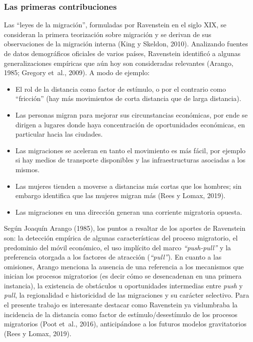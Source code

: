 \documentclass[12pt,spanish,]{article}
\begin{document}
\hypertarget{las-primeras-contribuciones}{%
\subsubsection{Las primeras
contribuciones}\label{las-primeras-contribuciones}}

Las ``leyes de la migración'', formuladas por Ravenstein en el siglo
XIX, se consideran la primera teorización sobre migración y se derivan
de sus observaciones de la migración interna (King y Skeldon, 2010).
Analizando fuentes de datos demográficos oficiales de varios países,
Ravenstein identificó a algunas generalizaciones empíricas que aún hoy
son consideradas relevantes (Arango, 1985; Gregory et~al., 2009). A modo
de ejemplo:

\begin{itemize}
\item
  El rol de la distancia como factor de estímulo, o por el contrario
  como ``fricción'' (hay más movimientos de corta distancia que de larga
  distancia).
\item
  Las personas migran para mejorar sus circunstancias económicas, por
  ende se dirigen a lugares donde haya concentración de oportunidades
  económicas, en particular hacia las ciudades.
\item
  Las migraciones se aceleran en tanto el movimiento es más fácil, por
  ejemplo si hay medios de transporte disponibles y las infraestructuras
  asociadas a los mismos.
\item
  Las mujeres tienden a moverse a distancias más cortas que los hombres;
  sin embargo identifica que las mujeres migran más (Rees y Lomax,
  2019).
\item
  Las migraciones en una dirección generan una corriente migratoria
  opuesta.
\end{itemize}

Según Joaquín Arango (1985), los puntos a resaltar de los aportes de
Ravenstein son: la detección empírica de algunas características del
proceso migratorio, el predominio del móvil económico, el uso implícito
del marco \emph{``push-pull''} y la preferencia otorgada a los factores
de atracción (\emph{``pull''}). En cuanto a las omisiones, Arango
menciona la ausencia de una referencia a los mecanismos que inician los
procesos migratorios (es decir cómo se desencadenan en una primera
instancia), la existencia de obstáculos u oportunidades intermedias
entre \emph{push} y \emph{pull}, la regionalidad e historicidad de las
migraciones y su carácter selectivo. Para el presente trabajo es
interesante destacar como Ravenstein ya vislumbraba la incidencia de la
distancia como factor de estímulo/desestímulo de los procesos
migratorios (Poot et~al., 2016), anticipándose a los futuros modelos
gravitatorios (Rees y Lomax, 2019).
\end{document}
